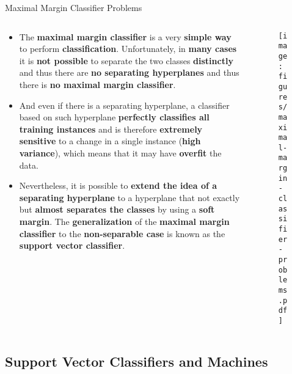 \documentclass[document.tex]{subfiles}
\begin{document}
    \begin{frame}{Maximal Margin Classifier Problems}
        \begin{columns}
            \begin{column}{0.6\textwidth}
                \begin{itemize}
                    \item The \textbf{maximal margin classifier} is a very \textbf{simple way} to perform \textbf{classification}. Unfortunately, in \textbf{many cases} it is \textbf{not possible} to separate the two classes \textbf{distinctly} and thus there are \textbf{no separating hyperplanes} and thus there is \textbf{no maximal margin classifier}.
                    \item And even if there is a separating hyperplane, a classifier based on such hyperplane \textbf{perfectly classifies all training instances} and is therefore \textbf{extremely sensitive} to a change in a single instance (\textbf{high variance}), which means that it may have \textbf{overfit} the data.
                    \item Nevertheless, it is possible to \textbf{extend the idea of a separating hyperplane} to a hyperplane that not exactly but \textbf{almost separates the classes} by using a \textbf{soft margin}. The \textbf{generalization} of the \textbf{maximal margin classifier} to the \textbf{non-separable case} is known as the \textbf{support vector classifier}.
                \end{itemize}
            \end{column}
            \begin{column}{0.4\textwidth}
                \begin{figure}
                    \label{fig:maximal-margin-classifier-problems}
                    \texttt{[image: figures/maximal-margin-classifier-problems.pdf]}
                \end{figure}
            \end{column}
        \end{columns}
    \end{frame}

    \subsection{Support Vector Classifiers and Machines}
    
\end{document}
